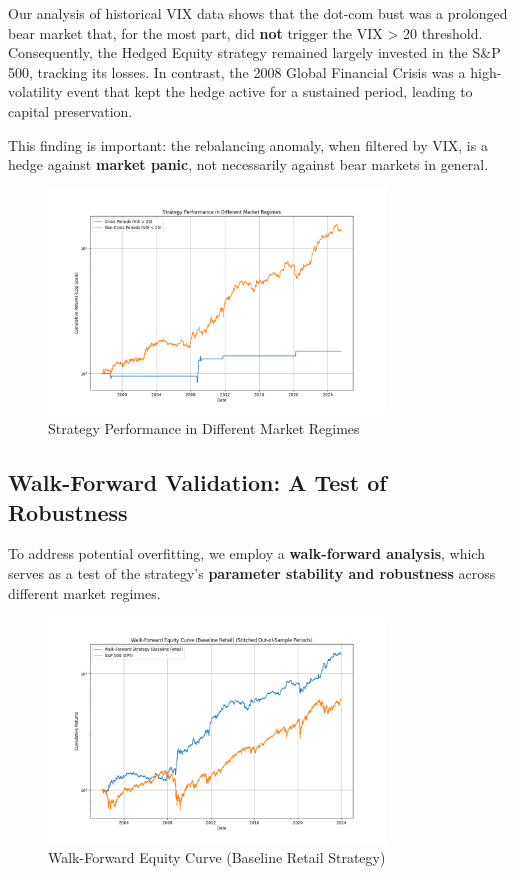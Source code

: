 \documentclass{article}
\begin{document}
Our analysis of historical VIX data shows that the dot-com bust was a prolonged bear market that, for the most part, did \textbf{not} trigger the VIX > 20 threshold. Consequently, the Hedged Equity strategy remained largely invested in the S\&P 500, tracking its losses. In contrast, the 2008 Global Financial Crisis was a high-volatility event that kept the hedge active for a sustained period, leading to capital preservation.

This finding is important: the rebalancing anomaly, when filtered by VIX, is a hedge against \textbf{market panic}, not necessarily against bear markets in general.

\begin{figure}[htbp]
\centering
\includegraphics[width=0.8\textwidth]{plot_crisis_analysis.png}
\caption{Strategy Performance in Different Market Regimes}
\end{figure}

\subsection{Walk-Forward Validation: A Test of Robustness}
To address potential overfitting, we employ a \textbf{walk-forward analysis}, which serves as a test of the strategy's \textbf{parameter stability and robustness} across different market regimes.

\begin{figure}[htbp]
\centering
\includegraphics[width=0.8\textwidth]{plot_walk_forward.png}
\caption{Walk-Forward Equity Curve (Baseline Retail Strategy)}
\label{fig:walk_forward}
\end{figure}
\end{document}
